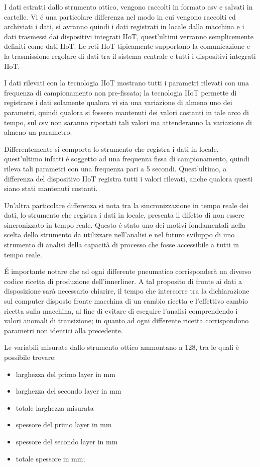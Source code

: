 I dati estratti dallo strumento ottico, vengono raccolti in formato csv e salvati in cartelle.
Vi é una particolare differenza nel modo in cui vengono raccolti ed archiviati i dati, si avranno quindi i dati registrati in locale dalla macchina e i dati trasmessi dai dispositivi integrati IIoT, quest'ultimi verranno semplicemente definiti come dati IIoT.
Le reti IIoT tipicamente supportano la comunicazione e la trasmissione regolare di dati tra il sistema centrale e tutti i dispositivi integrati IIoT.
\cite{SAP}



I dati rilevati con la tecnologia IIoT mostrano tutti i parametri rilevati con una frequenza di campionamento non pre-fissata; la tecnologia IIoT permette di registrare i dati solamente qualora vi sia una variazione di almeno uno dei parametri, quindi qualora si fossero mantenuti dei valori costanti in tale arco di tempo, sul csv non saranno riportati tali valori ma attenderanno la variazione di almeno un parametro.

Differentemente si comporta lo strumento che registra i dati in locale, quest'ultimo infatti é soggetto ad una frequenza fissa di campionamento, quindi rileva tali parametri con una frequenza pari a 5 secondi.
Quest'ultimo, a differenza del dispositivo IIoT registra tutti i valori rilevati, anche qualora questi siano stati mantenuti costanti.

Un'altra particolare differenza si nota tra la sincronizzazione in tempo reale dei dati, lo strumento che registra i dati in locale, presenta il difetto di non essere sincronizzato in tempo reale. 
Questo é stato uno dei motivi fondamentali nella scelta dello strumento da utilizzare nell'analisi e nel futuro sviluppo di uno strumento di analisi della capacità di processo che fosse accessibile a tutti in tempo reale.

É importante notare che ad ogni differente pneumatico corrisponderà un diverso codice ricetta di produzione dell'innerliner. 
A tal proposito di fronte ai dati a disposizione sarà necessario chiarire, il tempo che intercorre tra la dichiarazione sul computer disposto fronte macchina di un cambio ricetta e l'effettivo cambio ricetta sulla macchina, al fine di evitare di eseguire l'analisi comprendendo i valori anomali di transizione; in quanto ad ogni differente ricetta corrispondono parametri non identici alla precedente.

Le variabili misurate dallo strumento ottico ammontano a 128, tra le quali è possibile trovare:
\begin{itemize}
  \item larghezza del primo layer in mm
  \item larghezza del secondo layer in mm
   \item totale larghezza misurata
  \item spessore del primo layer in mm
  \item spessore del secondo layer in mm
 \item totale spessore in mm;
\end{itemize}

